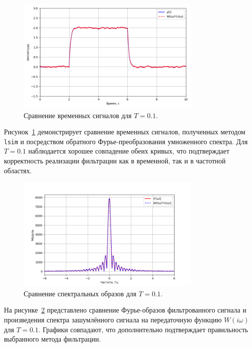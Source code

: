 \documentclass[a4paper]{article}
\begin{document}
\begin{figure}[H]
    \centering
    \includegraphics[width=0.8\textwidth]{src/task_1_1/time_comp_2.0_0.1.png}
    \caption{Сравнение временных сигналов для \(T=0.1\).}
    \label{fig:timecomp_0.1}
\end{figure}
\noindent Рисунок~\ref{fig:timecomp_0.1} демонстрирует сравнение временных сигналов, полученных методом \texttt{lsim} и посредством обратного Фурье-преобразования умноженного спектра. Для \(T=0.1\) наблюдается хорошее совпадение обеих кривых, что подтверждает корректность реализации фильтрации как в временной, так и в частотной областях.

\begin{figure}[H]
    \centering
    \includegraphics[width=0.8\textwidth]{src/task_1_1/spec_comp_2.0_0.1.png}
    \caption{Сравнение спектральных образов для \(T=0.1\).}
    \label{fig:speccomp_0.1}
\end{figure}
\noindent На рисунке~\ref{fig:speccomp_0.1} представлено сравнение Фурье-образов фильтрованного сигнала и произведения спектра зашумлённого сигнала на передаточную функцию \(W(i\omega)\) для \(T=0.1\). Графики совпадают, что дополнительно подтверждает правильность выбранного метода фильтрации.
\end{document}
